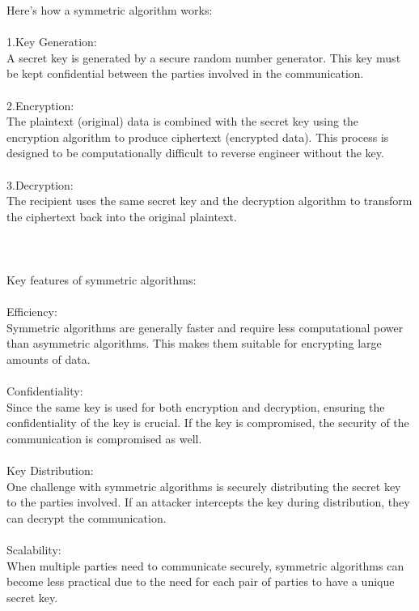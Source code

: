 \documentclass{report}
\begin{document}
Here's how a symmetric algorithm works:\\
\\
1.Key Generation:\\
 A secret key is generated by a secure random number generator. This key must be kept confidential between the parties involved in the communication.\\
\\
2.Encryption:\\
 The plaintext (original) data is combined with the secret key using the encryption algorithm to produce ciphertext (encrypted data). This process is designed to be computationally difficult to reverse engineer without the key.\\
\\
3.Decryption:\\
 The recipient uses the same secret key and the decryption algorithm to transform the ciphertext back into the original plaintext.\\
\\
\\
\\
Key features of symmetric algorithms:\\
\\
Efficiency:\\
 Symmetric algorithms are generally faster and require less computational power than asymmetric algorithms. This makes them suitable for encrypting large amounts of data.\\
\\
Confidentiality:\\
 Since the same key is used for both encryption and decryption, ensuring the confidentiality of the key is crucial. If the key is compromised, the security of the communication is compromised as well.\\
\\
Key Distribution:\\
 One challenge with symmetric algorithms is securely distributing the secret key to the parties involved. If an attacker intercepts the key during distribution, they can decrypt the communication.\\
\\
Scalability:\\
 When multiple parties need to communicate securely, symmetric algorithms can become less practical due to the need for each pair of parties to have a unique secret key.\\
\\
\\
\end{document}
